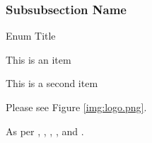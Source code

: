 \documentclass{TheMartianReport}
\begin{document}
\subsubsection{Subsubsection Name}
\lipsum[80]
\begin{niceenum}{Enum Title}
	\item This is an item
	\item This is a second item	
	\item {}
\end{niceenum}
\lipsum[40]

\lipsum[100]


\lipsum[40]

\lipsum[40] Please see Figure \ref{img:logo.png}.


\lipsum[100]

\lipsum[100] As per \cite{kopka2003guide}, \cite{mittelbach2004latex}, \cite{hahn1993latex}, \cite{long2015concept}, and \cite{griffiths1997learning}.


\end{document}

